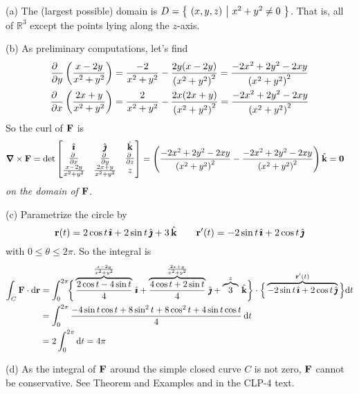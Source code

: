 \begin{solution} 

 (a) The (largest possible) domain is
$
D=\big\{ \ (x,y,z)\ \big|\ x^2+y^2\ne 0\ \big\}
$. That is, all of $\mathbb R^3$ except the points lying along the $z$-axis.

\noindent (b) 
As preliminary computations, let's find
\begin{align*}
\frac{\partial\hfill}{\partial y}\left(\frac{x-2y}{x^2+y^2}\right)
&=\frac{-2}{x^2+y^2}-\frac{2y(x-2y)}{{(x^2+y^2)}^2}
=\frac{-2x^2+2y^2-2xy}{{(x^2+y^2)}^2}
\\
\frac{\partial\hfill}{\partial x}\left(\frac{2x+y}{x^2+y^2}\right)
&=\frac{2}{x^2+y^2}-\frac{2x(2x+y)}{{(x^2+y^2)}^2}
=\frac{-2x^2+2y^2-2xy}{{(x^2+y^2)}^2}
\end{align*}
So the curl of $\mathbf{F}$ is
\begin{align*}
\vnabla\times\vF
&=\det\left[\begin{matrix}
\hi &\hj &\hk \\
\pdiff{}{x} & \pdiff{}{y} & 
                \pdiff{}{z} \\
\frac{x-2y}{x^2+y^2} & \frac{2x + y}{x^2+y^2} & z
\end{matrix}
\right]
=\left(\frac{-2x^2+2y^2-2xy}{{(x^2+y^2)}^2}
  -\frac{-2x^2+2y^2-2xy}{{(x^2+y^2)}^2}\right)\hk
=\vZero
\end{align*}
\emph{on the domain of $\mathbf{F}$}.

\noindent (c) Parametrize the circle by
\begin{equation*}
\mathbf{r}(t) = 2\cos t\,\hat{\pmb{\imath}} +2\sin t\,\hat{\pmb{\jmath}} +3\,\hat{\mathbf{k}}\qquad
\mathbf{r}'(t) = -2\sin t\,\hat{\pmb{\imath}} +2\cos t\,\hat{\pmb{\jmath}} 
\end{equation*}
with $0\le\theta\le 2\pi$. So the integral is
\begin{align*}
\int_C \mathbf{F} \cdot \mathrm{d}\mathbf{r}
&=\int_0^{2\pi}\!\!\bigg\{
       \overbrace{\frac{2\cos t-4\sin t}{4}}^{\frac{x-2y}{x^2+y^2}}\,\hat{\pmb{\imath}}
      +\overbrace{\frac{4\cos t + 2\sin t}{4}}^{\frac{2x+y}{x^2+y^2}}\,\hat{\pmb{\jmath}}
      + \overbrace{3}^{z}\,\hat{\mathbf{k}}\bigg\}
           \cdot
  \Big\{\overbrace{-2\sin t\,\hat{\pmb{\imath}} +2\cos t\,\hat{\pmb{\jmath}}}^{\mathbf{r}'(t)}\Big\}\mathrm{d}t \\
&=\int_0^{2\pi}
       \frac{-4\sin t\cos t+8\sin^2 t+8\cos^2t+4\sin t\cos t}{4}\,\mathrm{d}t \\
&= 2\int_0^{2\pi}\mathrm{d}t
=4\pi
\end{align*}

\noindent (d) As the integral of $\mathbf{F}$ around the simple closed curve $C$
is not zero, $\mathbf{F}$ cannot be conservative.
See Theorem  and
Examples  and 
in the CLP-4  text. 
\end{solution}

